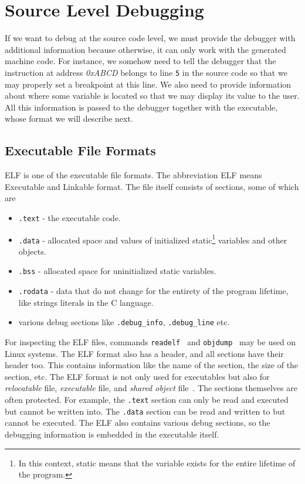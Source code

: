 \section{Source Level Debugging}\label{section:source-level-debugging}
If we want to debug at the source code level, we must provide the debugger with
additional information because otherwise, it can only work with the generated
machine code. For instance, we somehow need to tell the debugger that the
instruction at address \textit{0xABCD} belongs to line \texttt{5} in the source
code so that we may properly set a breakpoint at this line. We also need to
provide information about where some variable is located so that we may display
its value to the user. All this information is passed to the debugger together
with the executable, whose format we will describe next.

\subsection{Executable File Formats}\label{section:elf}
ELF is one of the executable file formats. The abbreviation ELF means
Executable and Linkable format. The file itself consists of sections, some of
which are
\begin{itemize}
    \item \texttt{.text} - the executable code.
    \item \texttt{.data} - allocated space and values of initialized
        static\footnote{In this context, static means that the variable exists
        for the entire lifetime of the program.} variables and other objects.
    \item \texttt{.bss} - allocated space for uninitialized static variables.
    \item \texttt{.rodata} - data that do not change for the entirety of the
        program lifetime, like strings literals in the C language.
    \item various debug sections like \verb|.debug_info|, \verb|.debug_line|
        etc.
\end{itemize}
For inspecting the ELF files, commands \texttt{readelf}~\cite{readelf} and
\texttt{objdump}~\cite{objdump} may be used on Linux systems. The ELF format
also has a header, and all sections have their header too. This contains
information like the name of the section, the size of the section, etc. The ELF
format is not only used for executables but also for \textit{relocatable} file,
\textit{executable} file, and \textit{shared object} file~\cite{elf}. The
sections themselves are often protected. For example, the \texttt{.text}
section can only be read and executed but cannot be written into. The
\texttt{.data} section can be read and written to but cannot be executed. The
ELF also contains various debug sections, so the debugging information is
embedded in the executable itself.

